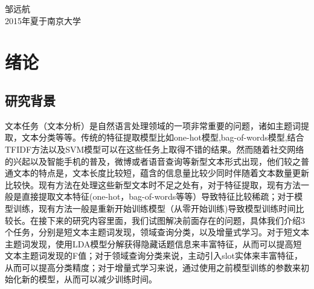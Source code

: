 \documentclass[master]{njuthesis}
\begin{document}
\begin{preface}
\vspace{1cm}
\begin{flushright}
邹远航\\
2015年夏于南京大学
\end{flushright}

\end{preface}

\tableofcontents

\listoffigures

\listoftables

\mainmatter


\chapter{绪论}\label{chapter_introduction}

\section{研究背景}
    
    文本任务（文本分析）是自然语言处理领域的一项非常重要的问题，诸如主题词提取，文本分类等等。传统的特征提取模型比如one-hot模型\cite{one-hot},bag-of-words模型\cite{bag-of-words},结合TFIDF方法\cite{keyword}以及SVM模型\cite{documentC}可以在这些任务上取得不错的结果。然而随着社交网络的兴起以及智能手机的普及，微博或者语音查询等新型文本形式出现，他们较之普通文本的特点是，文本长度比较短，蕴含的信息量比较少同时伴随着文本数量更新比较快。现有方法在处理这些新型文本时不足之处有，对于特征提取，现有方法一般是直接提取文本特征(one-hot，bag-of-words等等）导致特征比较稀疏；对于模型训练，现有方法一般是重新开始训练模型（从零开始训练)导致模型训练时间比较长。在接下来的研究内容里面，我们试图解决前面存在的问题，具体我们介绍3个任务，分别是短文本主题词发现，领域查询分类，以及增量式学习。对于短文本主题词发现，使用LDA模型分解获得隐藏话题信息来丰富特征，从而可以提高短文本主题词发现的F值；对于领域查询分类来说，主动引入slot实体来丰富特征，从而可以提高分类精度；对于增量式学习来说，通过使用之前模型训练的参数来初始化新的模型，从而可以减少训练时间。
\end{document}
